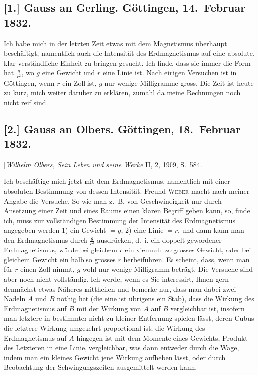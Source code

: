 \documentclass[12pt,a4paper]{article}
\begin{document}
\subsection*{[1.] Gauss an Gerling. G\"ottingen, 14.~Februar 1832.}

Ich habe mich in der letzten Zeit etwas mit dem Magnetismus \"uberhaupt besch\"aftigt, namentlich auch die Intensit\"at des Erdmagnetismus auf eine absolute, klar verst\"andliche Einheit zu bringen gesucht. Ich finde, dass sie immer die Form hat $\frac{g}{r^2}$, wo $g$ eine Gewicht und $r$ eine Linie ist. Nach einigen Versuchen ist in G\"ottingen, wenn $r$ ein Zoll ist, $g$ nur wenige Milligramme gross. Die Zeit ist heute zu kurz, mich weiter dar\"uber zu erkl\"aren, zumahl da meine Rechnungen noch nicht reif sind.\dotfill

\subsection*{[2.] Gauss an Olbers. G\"ottingen, 18.~Februar 1832.}

[\textit{Wilhelm Olbers, Sein Leben und seine Werke} II, 2, 1909, S.~584.]

\medskip\noindent
Ich besch\"aftige mich jetzt mit dem Erdmagnetismus, namentlich mit einer absoluten Bestimmung von dessen Intensit\"at. Freund \textsc{Weber} macht nach meiner Angabe die Versuche. So wie man z.~B. von Geschwindigkeit nur durch Ansetzung einer Zeit und eines Raums einen klaren Begriff geben kann, so, finde ich, muss zur vollst\"andigen Bestimmung der Intensit\"at des Erdmagnetismus angegeben werden 1) ein Gewicht $=g$, 2) eine Linie $=r$, und dann kann man den Erdmagnetismus durch $\frac{g}{r^2}$ ausdr\"ucken, d.~i. ein doppelt gewordener Erdmagnetismus, w\"urde bei gleichem $r$ ein viermahl so grosses Gewicht, oder bei gleichem Gewicht ein halb so grosses $r$ herbeif\"uhren. Es scheint, dass, wenn man f\"ur $r$ einen Zoll nimmt, $g$ wohl nur wenige Milligramm betr\"agt. Die Versuche sind aber noch nicht vollst\"andig. Ich werde, wenn es Sie interessirt, Ihnen gern demn\"achst etwas N\"aheres mittheilen und bemerke nur, dass man dabei zwei Nadeln $A$ und $B$ n\"othig hat (die eine ist \"ubrigens ein Stab), dass die Wirkung des Erdmagnetismus auf $B$ mit der Wirkung von $A$ auf $B$ vergleichbar ist, insofern man letztere in bestimmter nicht zu kleiner Entfernung spielen l\"asst, deren Cubus die letztere Wirkung umgekehrt proportional ist; die Wirkung des Erdmagnetismus auf $A$ hingegen ist mit dem Momente eines Gewichts, Produkt des Letzteren in eine Linie, vergleichbar, was dann entweder durch die Wage, indem man ein kleines Gewicht jene Wirkung aufheben l\"asst, oder durch Beobachtung der Schwingungszeiten ausgemittelt werden kann.
\end{document}
